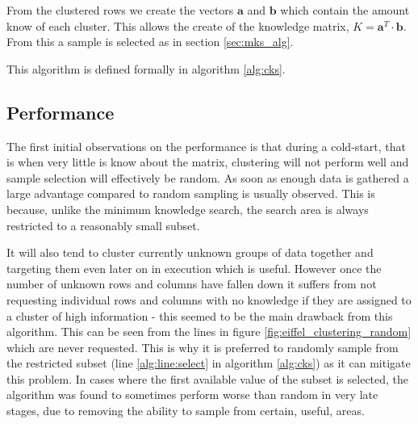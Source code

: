 From the clustered rows we create the vectors $\mathbf{a}$ and $\mathbf{b}$ which contain the amount know of each cluster. This allows the create of the knowledge matrix, $K =\mathbf{a}^T \cdot \mathbf{b}$. From this a sample is selected as in section \ref{sec:mks_alg}.

This algorithm is defined formally in algorithm \ref{alg:cks}.

\subsection{Performance}
The first initial observations on the performance is that during a cold-start, that is when very little is know about the matrix, clustering will not perform well and sample selection will effectively be random. As soon as enough data is gathered a large advantage compared to random sampling is usually observed. This is because, unlike the minimum knowledge search, the search area is always restricted to a reasonably small subset.


It will also tend to cluster currently unknown groups of data together and targeting them even later on in execution which is useful. However once the number of unknown rows and columns have fallen down it suffers from not requesting individual rows and columns with no knowledge if they are assigned to a cluster of high information - this seemed to be the main drawback from this algorithm. This can be seen from the lines in figure \ref{fig:eiffel_clustering_random} which are never requested. This is why it is preferred to randomly sample from the restricted subset (line \ref{alg:line:select} in algorithm \ref{alg:cks}) as it can mitigate this problem. In cases where the first available value of the subset is selected, the algorithm was found to sometimes perform worse than random in very late stages, due to removing the ability to sample from certain, useful, areas.



